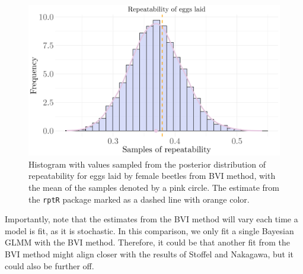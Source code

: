 \begin{figure}[H]
  \centering
  \includegraphics[width=1\linewidth]{Figures/Stoffel Comparison/Heritability_egg_poisson.png}
  \caption[Estimated repeatability of eggs laid by female beetles]{Histogram with values sampled from the posterior distribution of repeatability for eggs laid by female beetles from BVI method, with the mean of the samples denoted by a pink circle. The estimate from the \texttt{rptR} package marked as a dashed line with orange color.}
  \label{fig:heritability_eggs_poisson}
\end{figure}
\noindent Importantly, note that the estimates from the BVI method will vary each time a model is fit, as it is stochastic. In this comparison, we only fit a single Bayesian GLMM with the BVI method. Therefore, it could be that another fit from the BVI method might align closer with the results of Stoffel and Nakagawa, but it could also be further off. 

